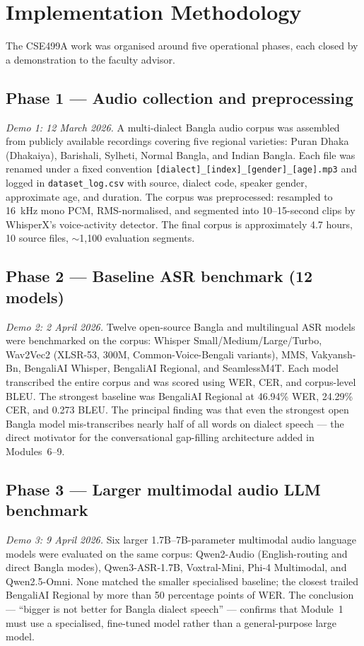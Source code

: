 \documentclass[12pt,a4paper]{article}
\begin{document}
\section{Implementation Methodology}
\label{sec:phases}

The CSE499A work was organised around five operational phases, each
closed by a demonstration to the faculty advisor.

\subsection*{Phase 1 --- Audio collection and preprocessing}
\textit{Demo 1: 12 March 2026.}
A multi-dialect Bangla audio corpus was assembled from publicly
available recordings covering five regional varieties: Puran Dhaka
(Dhakaiya), Barishali, Sylheti, Normal Bangla, and Indian Bangla.
Each file was renamed under a fixed convention
\texttt{[dialect]\_[index]\_[gender]\_[age].mp3} and logged in
\texttt{dataset\_log.csv} with source, dialect code, speaker gender,
approximate age, and duration. The corpus was preprocessed: resampled
to 16~kHz mono PCM, RMS-normalised, and segmented into 10--15-second
clips by WhisperX's voice-activity detector. The final corpus is
approximately 4.7 hours, 10 source files, $\sim$1{,}100 evaluation
segments.

\subsection*{Phase 2 --- Baseline ASR benchmark (12 models)}
\textit{Demo 2: 2 April 2026.}
Twelve open-source Bangla and multilingual ASR models were benchmarked
on the corpus: Whisper Small/Medium/Large/Turbo, Wav2Vec2 (XLSR-53,
300M, Common-Voice-Bengali variants), MMS, Vakyansh-Bn, BengaliAI
Whisper, BengaliAI Regional, and SeamlessM4T. Each model transcribed
the entire corpus and was scored using WER, CER, and corpus-level BLEU.
The strongest baseline was BengaliAI Regional at 46.94\% WER, 24.29\%
CER, and 0.273 BLEU. The principal finding was that even the strongest
open Bangla model mis-transcribes nearly half of all words on dialect
speech --- the direct motivator for the conversational gap-filling
architecture added in Modules~6--9.

\subsection*{Phase 3 --- Larger multimodal audio LLM benchmark}
\textit{Demo 3: 9 April 2026.}
Six larger 1.7B--7B-parameter multimodal audio language models were
evaluated on the same corpus: Qwen2-Audio (English-routing and direct
Bangla modes), Qwen3-ASR-1.7B, Voxtral-Mini, Phi-4 Multimodal, and
Qwen2.5-Omni. None matched the smaller specialised baseline; the
closest trailed BengaliAI Regional by more than 50 percentage points
of WER. The conclusion --- ``bigger is not better for Bangla dialect
speech'' --- confirms that Module~1 must use a specialised, fine-tuned
model rather than a general-purpose large model.
\end{document}
